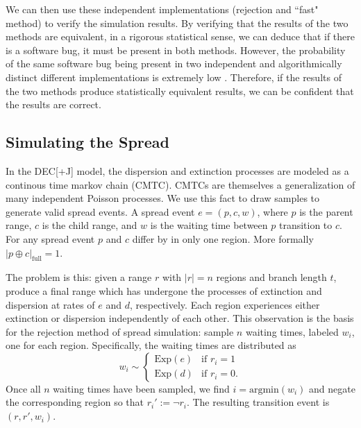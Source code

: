 \documentclass[a4paper]{article}
\newcommand{\CountFull}[1]{|#1|_\text{full}}
\newcommand{\decj}{DEC[+J]}
\newcommand{\rneg}[1]{\neg #1}
\newcommand{\rxor}[2]{#1 \oplus #2}
\begin{document}
We can then use these independent implementations (rejection and ``fast" method) to verify the simulation results.
By verifying that the results of the two methods are equivalent, in a rigorous statistical sense, we can
deduce that if there is a software bug, it must be present in both methods.
However, the probability of the same software bug being present in two independent and algorithmically distinct different
implementations is extremely low \cite{sklaroff1976, taneja2010}.
Therefore, if the results of the two methods produce statistically equivalent results, we can be confident that the
results are correct.


\subsection{Simulating the Spread}

In the \decj{} model, the dispersion and extinction processes are modeled as a continous time markov chain (CMTC).
CMTCs are themselves a generalization of many independent Poisson processes.
We use this fact to draw samples to generate valid spread events.
A spread event $e = (p, c, w)$, where $p$ is the parent range, $c$ is the child range, and $w$ is the waiting time
between $p$ transition to $c$.
For any spread event $p$ and $c$ differ by in only one region.
More formally $\CountFull{\rxor{p}{c}} = 1$.

The problem is this: given a range \( r \) with \( |r| = n \) regions and branch length \( t \), produce a final range
which has undergone the processes of extinction and dispersion at rates of \( e \) and \( d \), respectively.
Each region experiences either extinction or dispersion independently of each other.
This observation is the basis for the rejection method of spread simulation: sample $n$ waiting times,
labeled \( w_i \), one for each region.
Specifically, the waiting times are distributed as
\begin{equation}
	\label{eq:exp-rejection} w_i \sim
	\begin{cases}
		\text{Exp}(e) & \text{if } r_i = 1 \\
    \text{Exp}(d) & \text{if } r_i = 0.
	\end{cases}
\end{equation}
Once all $n$ waiting times have been sampled, we find $ i = \text{argmin}(w_i)$ and negate the corresponding
region so that $r_i' := \rneg{r_i}$.
The resulting transition event is $(r, r', w_i)$.
\end{document}
